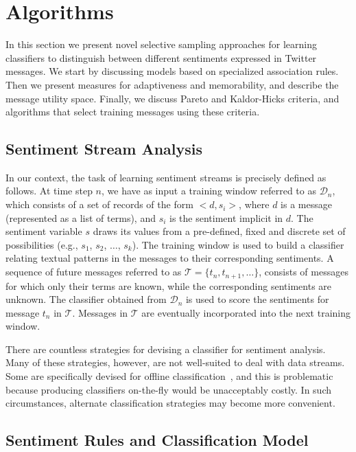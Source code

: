\section{Algorithms}

In this section we present novel selective sampling approaches for learning classifiers to distinguish between different sentiments expressed in Twitter messages. We start by discussing models based on specialized association rules.
Then we present measures for adaptiveness and memorability, and describe the message utility space. Finally, we discuss Pareto and Kaldor-Hicks criteria, and algorithms that select training messages using these criteria.

\subsection{Sentiment Stream Analysis}

In our context, the task of learning sentiment streams is precisely defined as follows. At time step $n$, we have as input
a training window referred to as $\mathcal{D}_n$, which consists of
a set of records of the form $<d,s_i>$, where $d$ is a
message (represented as a list of terms),
and $s_i$ is the sentiment implicit in $d$.
The sentiment variable $s$ draws its values from a pre-defined, fixed and discrete set of possibilities (e.g., $s_1$,
$s_2$, $\ldots$, $s_k$).
The training window is used to build a classifier relating textual patterns in the messages to their corresponding sentiments.
A sequence of future messages referred to as $\mathcal{T}=\{t_n, t_{n+1}, \ldots\}$, consists of messages
for which only their terms are known, while the corresponding sentiments are unknown.
The classifier obtained from $\mathcal{D}_n$ is used
to score the sentiments for message $t_n$ in $\mathcal{T}$.
Messages in $\mathcal{T}$ are eventually incorporated into the next training window.

There are countless strategies for devising
a classifier for sentiment analysis. Many of these strategies, however, are not well-suited to deal with data streams. Some are specifically devised for offline classification~\cite{trees,cortes}, and this is problematic because producing classifiers on-the-fly would be unacceptably costly. %
In such circumstances, alternate classification strategies may become more convenient.

\subsection{Sentiment Rules and Classification Model}

